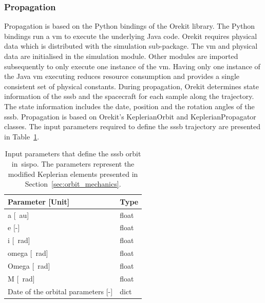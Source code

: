 
\subsubsection{Propagation}
Propagation is based on the Python bindings of the Orekit library. The Python bindings run a \gls{vm} to execute the underlying Java code. Orekit requires physical data which is distributed with the simulation sub-package. The \gls{vm} and physical data are initialised in the simulation module. Other modules are imported subsequently to only execute one instance of the \gls{vm}. Having only one instance of the Java \gls{vm} executing reduces resource consumption and provides a single consistent set of physical constants. During propagation, Orekit determines state information of the \gls{sssb} and the spacecraft for each sample along the trajectory. The state information includes the date, position and the rotation angles of the \gls{sssb}. Propagation is based on Orekit's KeplerianOrbit and KeplerianPropagator classes. The input parameters required to define the \gls{sssb} trajectory are presented in Table~\ref{tab:keplerorbit_params}.

\begin{table}[htb]
    \centering
    \caption{Input parameters that define the \gls{sssb} orbit in~\gls{sispo}. The parameters represent the modified Keplerian elements presented in Section~\ref{sec:orbit_mechanics}.}
    \label{tab:keplerorbit_params}
    \begin{tabular}{p{}|p{}}
        \textbf{Parameter [Unit]} & \textbf{Type} \\ \hline
        a [\SI{}{au}] & float\\
        e [-] & float\\
        i [\SI{}{\radian}] & float \\
        omega [\SI{}{\radian}] & float \\
        Omega [\SI{}{\radian}] & float \\
        M [\SI{}{\radian}] & float \\
        Date of the orbital parameters [-] & dict\footnotemark
    \end{tabular}
\end{table}

